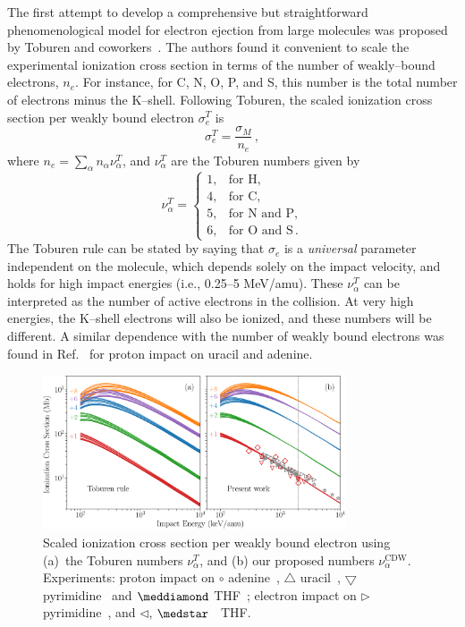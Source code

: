 \documentclass[preprint,showpacs]{revtex4}
\begin{document}
The first attempt to develop a comprehensive but straightforward 
phenomenological model for electron ejection from large molecules was 
proposed by Toburen and coworkers~\cite{toburen1975,toburen1976}. 
The authors found it convenient to scale the experimental ionization 
cross section in terms of the number of weakly--bound electrons, $n_e$.
For instance, for C, N, O, P, and S, this number is the total number of 
electrons minus the K--shell. Following Toburen, the scaled ionization 
cross section per weakly bound electron $\sigma_{e}^T$ is
\begin{equation}
\sigma_{e}^T=\frac{\sigma_{M}}{n_e}\,, 
\label{27} 
\end{equation}
where $n_e=\sum_{\alpha}n_{\alpha}\nu_{\alpha}^T$, and $\nu_{\alpha}^T$ 
are the Toburen numbers given by
\begin{equation}
\nu_{\alpha}^T=\left\{ 
\begin{array}{ll}
1, & \text{for H,} \\
4, & \text{for C,} \\ 
5, & \text{for N and P,} \\ 
6, & \text{for O and S}\,.
\end{array}\right.
\label{eq:nelec} 
\end{equation} 
The Toburen rule can be stated by saying that 
$\sigma_{e}$ is a \textit{universal} parameter independent on the 
molecule, which depends solely on the impact velocity, and holds for 
high impact energies (i.e., 0.25--5 MeV/amu).
These $\nu_{\alpha}^T$ can be interpreted as the number of active 
electrons in the collision. At very high energies, the K--shell 
electrons will also be ionized, and these numbers will be different.
A similar dependence with the number of weakly bound electrons was 
found in Ref.~\cite{itoh2013} for proton impact on uracil and adenine.

\begin{figure}[t!]
\centering
\includegraphics[width=0.8\textwidth]{figuras/molscaling85.eps}
\caption{Scaled ionization cross section per weakly bound electron using
(a)~the Toburen numbers $\nu_{\alpha}^T$, and (b) our proposed numbers
$\nu_{\alpha}^{\text{CDW}}$. Experiments: proton impact on 
\mbox{\Large$\circ$} adenine~\cite{iriki2011}, 
$\triangle$ uracil~\cite{itoh2013}, 
$\bigtriangledown$ pyrimidine~\cite{wolff2014} and $\meddiamond$ 
THF~\cite{wang2016}; electron impact on $\rhd$ pyrimidine~\cite{bug2017},
and $\lhd$, $\medstar$~\cite{wolf2019,fuss2009} THF.}
\label{fig:newscaling}
\end{figure}
\end{document}
